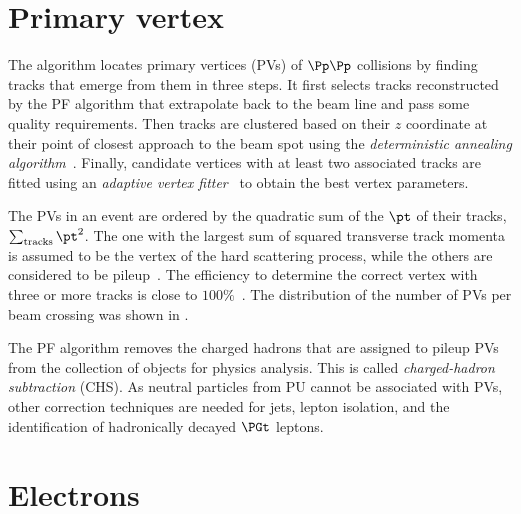 \section{Primary vertex} \label{sec:PV}
The algorithm locates primary vertices (PVs) of $\Pp\Pp$ collisions by finding tracks that emerge from them in three steps.
It first selects tracks reconstructed by the PF algorithm that extrapolate back to the beam line and pass some quality requirements. 
Then tracks are clustered based on their $z$ coordinate at their point of closest approach to the beam spot using the \emph{deterministic annealing algorithm}~\cite{deterministic_annealing}.
Finally, candidate vertices with at least two associated tracks are fitted using an \emph{adaptive vertex fitter}~\cite{vertex_fitting} to obtain the best vertex parameters.

The PVs in an event are ordered by the quadratic sum of the $\pt$ of their tracks, $\sum_\text{tracks}\pt^2$.
The one with the largest sum of squared transverse track momenta is assumed to be the vertex of the hard scattering process, while the others are considered to be pileup~\cite{CMS_vertex,PF2017,CMS_vertex_phase2}.
The efficiency to determine the correct vertex with three or more tracks is close to $100\%$~\cite{CMS_vertex}.
The distribution of the number of PVs per beam crossing was shown in .

The PF algorithm removes the charged hadrons that are assigned to pileup PVs from the collection of objects for physics analysis. This is called \emph{charged-hadron subtraction} (CHS).
As neutral particles from PU cannot be associated with PVs, other correction techniques are needed for jets, lepton isolation, and the identification of hadronically decayed $\PGt$ leptons.




\section{Electrons} \label{sec:electron}

